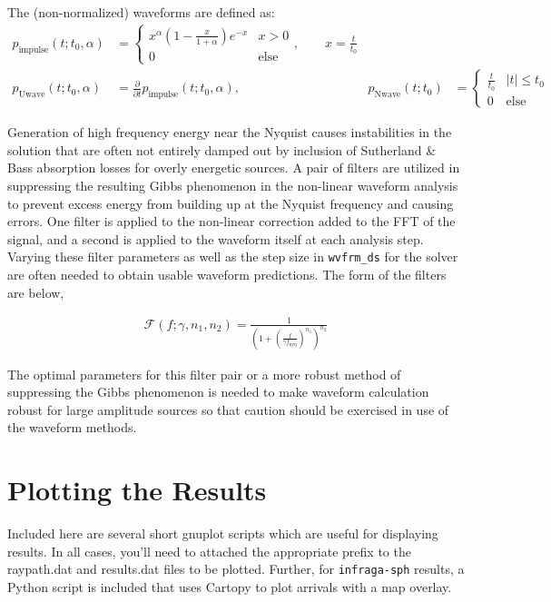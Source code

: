 \documentclass[10pt]{article}
\begin{document}
\noindent The (non-normalized) waveforms are defined as:
\begin{align*}
 p_\text{impulse} \left( t; t_0, \alpha \right) & = \left\{ 
 \begin{matrix}
 x^\alpha \left( 1 - \frac{x}{1 + \alpha} \right) e^{-x}  & x > 0 \\
 0 & \text{else} 
 \end{matrix}
 \right., \quad \quad x = \frac{t}{t_0} \\
 p_\text{Uwave} \left( t; t_0, \alpha \right) & = \frac{\partial}{\partial t} p_\text{impulse} \left( t; t_0, \alpha \right), \quad \quad & 
 p_\text{Nwave} \left( t; t_0 \right)  & = \left\{ 
 \begin{matrix}
 \frac{t}{t_0}  	& | t |  \leq t_0 \\
 0 			& \text{else} 
 \end{matrix}
 \right.
 \end{align*}

Generation of high frequency energy near the Nyquist causes instabilities in the solution that are often not entirely damped out by inclusion of Sutherland \& Bass absorption losses for overly energetic sources.  A pair of filters are utilized in suppressing the resulting Gibbs phenomenon in the non-linear waveform analysis to prevent excess energy from building up at the Nyquist frequency and causing errors.  One filter is applied to the non-linear correction added to the FFT of the signal, and a second is applied to the waveform itself at each analysis step.  Varying these filter parameters as well as the step size in \verb=wvfrm_ds= for the solver are often needed to obtain usable waveform predictions.  The form of the filters are below,

\begin{align*}
 \mathcal{F} \left( f; \gamma, n_1, n_2  \right) = \frac{1}{\left( 1 + \left( \frac{f}{\gamma f_\text{nyq}} \right)^{n_1} \right)^{n_2}}
\end{align*}

The optimal parameters for this filter pair or a more robust method of suppressing the Gibbs phenomenon is needed to make waveform calculation robust for large amplitude sources so that caution should be exercised in use of the waveform methods.

\newpage
\section{Plotting the Results}
Included here are several short gnuplot scripts which are useful for displaying results.  In all cases, you'll need to attached the appropriate prefix to the raypath.dat and results.dat files to be plotted.  Further, for \verb=infraga-sph= results, a Python script is included that uses Cartopy to plot arrivals with a map overlay. \newline
\end{document}
